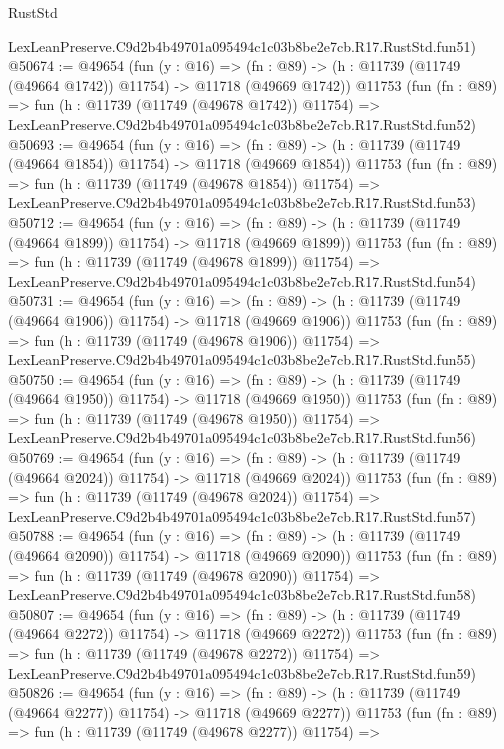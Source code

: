 \begin{lexlean}{RustStd}
\begin{coremodule}
    LexLeanPreserve.C9d2b4b49701a095494c1c03b8be2e7cb.R17.RustStd.fun51)
@50674 := @49654
    (fun (y : @16) =>
    (fn : @89) -> (h : @11739 (@11749 (@49664 @1742)) @11754) -> @11718 (@49669 @1742))
    @11753
    (fun (fn : @89) =>
    fun (h : @11739 (@11749 (@49678 @1742)) @11754) =>
    LexLeanPreserve.C9d2b4b49701a095494c1c03b8be2e7cb.R17.RustStd.fun52)
@50693 := @49654
    (fun (y : @16) =>
    (fn : @89) -> (h : @11739 (@11749 (@49664 @1854)) @11754) -> @11718 (@49669 @1854))
    @11753
    (fun (fn : @89) =>
    fun (h : @11739 (@11749 (@49678 @1854)) @11754) =>
    LexLeanPreserve.C9d2b4b49701a095494c1c03b8be2e7cb.R17.RustStd.fun53)
@50712 := @49654
    (fun (y : @16) =>
    (fn : @89) -> (h : @11739 (@11749 (@49664 @1899)) @11754) -> @11718 (@49669 @1899))
    @11753
    (fun (fn : @89) =>
    fun (h : @11739 (@11749 (@49678 @1899)) @11754) =>
    LexLeanPreserve.C9d2b4b49701a095494c1c03b8be2e7cb.R17.RustStd.fun54)
@50731 := @49654
    (fun (y : @16) =>
    (fn : @89) -> (h : @11739 (@11749 (@49664 @1906)) @11754) -> @11718 (@49669 @1906))
    @11753
    (fun (fn : @89) =>
    fun (h : @11739 (@11749 (@49678 @1906)) @11754) =>
    LexLeanPreserve.C9d2b4b49701a095494c1c03b8be2e7cb.R17.RustStd.fun55)
@50750 := @49654
    (fun (y : @16) =>
    (fn : @89) -> (h : @11739 (@11749 (@49664 @1950)) @11754) -> @11718 (@49669 @1950))
    @11753
    (fun (fn : @89) =>
    fun (h : @11739 (@11749 (@49678 @1950)) @11754) =>
    LexLeanPreserve.C9d2b4b49701a095494c1c03b8be2e7cb.R17.RustStd.fun56)
@50769 := @49654
    (fun (y : @16) =>
    (fn : @89) -> (h : @11739 (@11749 (@49664 @2024)) @11754) -> @11718 (@49669 @2024))
    @11753
    (fun (fn : @89) =>
    fun (h : @11739 (@11749 (@49678 @2024)) @11754) =>
    LexLeanPreserve.C9d2b4b49701a095494c1c03b8be2e7cb.R17.RustStd.fun57)
@50788 := @49654
    (fun (y : @16) =>
    (fn : @89) -> (h : @11739 (@11749 (@49664 @2090)) @11754) -> @11718 (@49669 @2090))
    @11753
    (fun (fn : @89) =>
    fun (h : @11739 (@11749 (@49678 @2090)) @11754) =>
    LexLeanPreserve.C9d2b4b49701a095494c1c03b8be2e7cb.R17.RustStd.fun58)
@50807 := @49654
    (fun (y : @16) =>
    (fn : @89) -> (h : @11739 (@11749 (@49664 @2272)) @11754) -> @11718 (@49669 @2272))
    @11753
    (fun (fn : @89) =>
    fun (h : @11739 (@11749 (@49678 @2272)) @11754) =>
    LexLeanPreserve.C9d2b4b49701a095494c1c03b8be2e7cb.R17.RustStd.fun59)
@50826 := @49654
    (fun (y : @16) =>
    (fn : @89) -> (h : @11739 (@11749 (@49664 @2277)) @11754) -> @11718 (@49669 @2277))
    @11753
    (fun (fn : @89) =>
    fun (h : @11739 (@11749 (@49678 @2277)) @11754) =>

\end{coremodule}
\end{lexlean}
